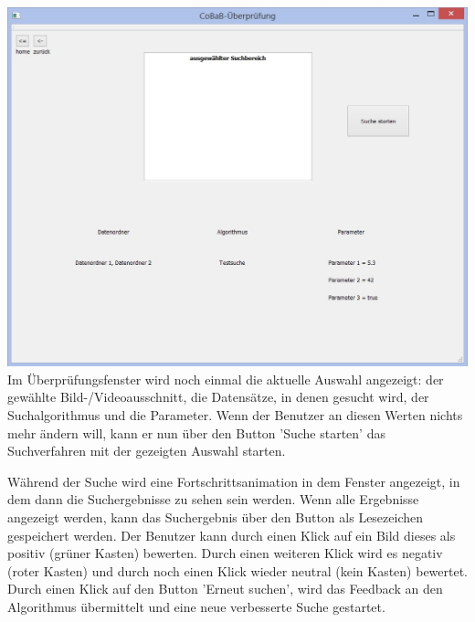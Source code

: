 \includegraphics[width=1\linewidth]{img/Ueberpruefung}
Im Überprüfungsfenster wird noch einmal die aktuelle Auswahl angezeigt: der gewählte Bild-/Videoausschnitt, die Datensätze, in denen gesucht wird, der Suchalgorithmus und die Parameter. Wenn der Benutzer an diesen Werten nichts mehr ändern will, kann er nun über den Button 'Suche starten' das Suchverfahren mit der gezeigten Auswahl starten.

Während der Suche wird eine Fortschrittsanimation in dem Fenster angezeigt, in dem dann die Suchergebnisse zu sehen sein werden. Wenn alle Ergebnisse angezeigt werden, kann das Suchergebnis über den Button als Lesezeichen gespeichert werden.\newline 
Der Benutzer kann durch einen Klick auf ein Bild dieses als positiv (grüner Kasten) bewerten. Durch einen weiteren Klick wird es negativ (roter Kasten) und durch noch einen Klick wieder neutral (kein Kasten) bewertet. Durch einen Klick auf den Button 'Erneut suchen', wird das Feedback an den Algorithmus übermittelt und eine neue verbesserte Suche gestartet.
